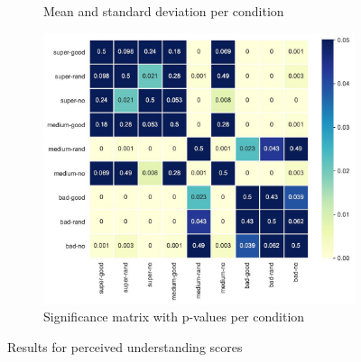 \begin{figure}[H]
	\begin{subfigure}[b]{0.3\textwidth}
		\caption{Mean and standard deviation per condition}
		\label{tab:results_table_understanding}
	\end{subfigure}
	\begin{subfigure}[b]{0.65\textwidth}
		\includegraphics[width=\textwidth]{img/results_matrix_understanding2.JPG}
		\caption{Significance matrix with p-values per condition}
		\label{fig:results_matrix_understanding}
	\end{subfigure}
	\caption{Results for perceived understanding scores}
	\label{fig:results_understanding}
\end{figure}


